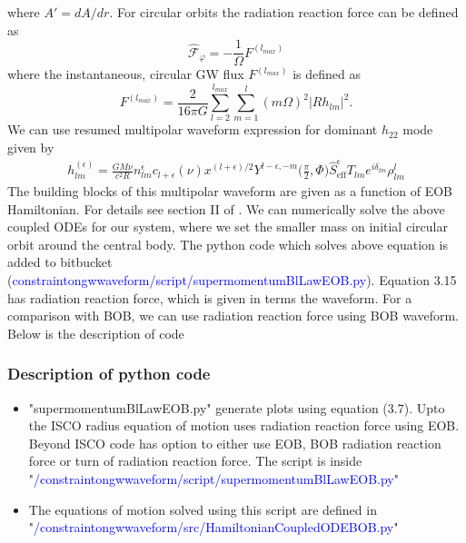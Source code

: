 \documentclass[prd,preprintnumbers,onecolumn,eqsecnum,floatfix,letter]{revtex4}
\begin{document}
where $A' = dA/dr$. For circular orbits the radiation reaction force can be defined as
\begin{equation}
	\hat{\mathscr{F}}_{\varphi} = -\frac{1}{\Omega}F^{(l_{max})}
\end{equation}
where the instantaneous, circular GW flux $F^{(l_{max})}$ is defined as
\begin{equation}
	F^{(l_{max})} = \frac{2}{16\pi G}\sum_{l=2}^{l_{max}}\sum_{m=1}^{l}\left(m\Omega\right)^{2} |Rh_{lm}|^2.
\end{equation}
We can use resumed multipolar waveform expression for dominant $h_{22}$ mode given by\cite{Damour_2009}
\begin{align}
	h_{lm}^{\left(\epsilon\right)} = \frac{GM\nu}{c^2 R}n_{lm}^{\epsilon}c_{l+\epsilon}\left(\nu\right)x^{\left(l+\epsilon\right)/2}Y^{l-\epsilon,-m}\bigg(\frac{\pi}{2}, \Phi\bigg)\hat{S}_{\text{eff}}^{\epsilon}T_{lm}e^{i\delta_{lm}}\rho_{lm}^l
\end{align}
The building blocks of this multipolar waveform are given as a function of EOB Hamiltonian. For details see section II of \cite{Damour_2009}. We can numerically solve the above coupled ODEs for our system, where we set the smaller mass on initial circular orbit around the central body. The python code which solves above equation is added to bitbucket (\textcolor{blue}{constraintongwwaveform/script/supermomentumBlLawEOB.py}). Equation 3.15 has radiation reaction force, which is given in terms the waveform. For a comparison with BOB, we can use radiation reaction force using BOB waveform. Below is the description of code    
\subsubsection{Description of python code}
\begin{itemize}
\item "supermomentumBlLawEOB.py" generate plots using equation (3.7). Upto the ISCO radius equation of motion uses radiation reaction force using EOB. Beyond ISCO code has option to either use EOB, BOB radiation reaction force or turn of radiation reaction force. The script is inside "\textcolor{blue}{/constraintongwwaveform/script/supermomentumBlLawEOB.py}"
\item The equations of motion solved using this script are defined in "\textcolor{blue}{/constraintongwwaveform/src/HamiltonianCoupledODEBOB.py}" 
\end{itemize}
\end{document}
